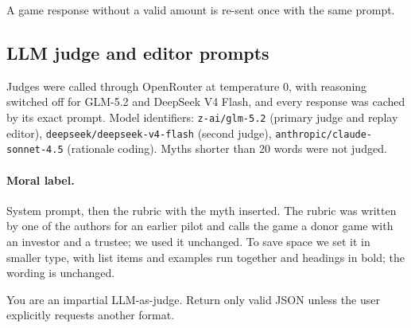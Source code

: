 A game response without a valid amount is re-sent once with the same prompt.

\subsection{LLM judge and editor prompts}
\label{sec:judge-prompts}
Judges were called through OpenRouter at temperature 0, with reasoning switched off for GLM-5.2 and DeepSeek V4 Flash, and every response was cached by its exact prompt. Model identifiers: \texttt{z-ai/glm-5.2} (primary judge and replay editor), \texttt{deepseek/deepseek-v4-flash} (second judge), \texttt{anthropic/claude-sonnet-4.5} (rationale coding). Myths shorter than 20 words were not judged.

\paragraph{Moral label.} System prompt, then the rubric with the myth inserted. The rubric was written by one of the authors for an earlier pilot and calls the game a donor game with an investor and a trustee; we used it unchanged. To save space we set it in smaller type, with list items and examples run together and headings in bold; the wording is unchanged.
\begin{promptbox}
You are an impartial LLM-as-judge. Return only valid JSON unless the user explicitly requests another format.
\end{promptbox}
